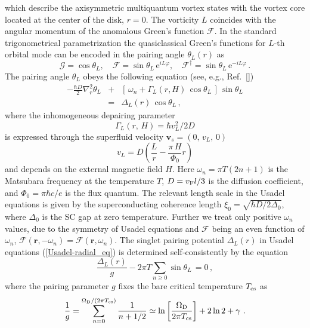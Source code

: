 \documentclass[prx,twocolumn,aps,superscriptaddress,showpacs,amsmath,amssymb,footnoteinbib]{revtex4-1}
\begin{document}
%
which describe the axisymmetric multiquantum vortex states with
the vortex core located at the center of the disk, $r=0$. The
vorticity $L$ coincides with the angular momentum of the
anomalous Green's function $\mathcal{F}$. In the standard
trigonometrical parametrization the quasiclassical Green's
functions for $L$-th orbital mode can be encoded in the pairing
angle $\theta_L(r)$ as
$$
\mathcal{G} =\cos\theta_L,\quad \mathcal{F} = \sin\theta_L\,
\mathrm{e}^{i L \varphi},\quad \mathcal{F}^\dag = \sin\theta_L\,
\mathrm{e}^{-i L \varphi}\,.
$$
The pairing angle $\theta_L$ obeys the following equation (see, e.g.,
Ref.~[])
%
\begin{eqnarray}\label{Usadel-radial_eq}
    -\frac{\hbar D}{2} \nabla_r^2 \theta_L
    &+& \left[\, \omega_n + \Gamma_L(r,H)\,\cos\theta_L\,
    \right]\,\sin\theta_L \\
    &=& \Delta_L(r)\, \cos\theta_L\,, \nonumber
\end{eqnarray}
%
where the inhomogeneous depairing parameter
%
\begin{equation}\label{depair-par}
    \Gamma_L(r,\,H) = \hbar v_L^2 / 2D
\end{equation}
%
is expressed through the superfluid velocity $\mathbf{v}_s =
(0,\,v_L,\,0)$
%
\begin{equation}\label{super_velocity}
    v_L = D \left( \frac{L}{r} - \frac{\pi\,H}{\Phi_0} r \right)
\end{equation}
%
and depends on the external magnetic field $H$.
Here $\omega_n = \pi T ( 2 n + 1 )$ is the Matsubara frequency at the temperature $T$,
$D = v_{\rm F} l / 3$ is the diffusion coefficient, and
$\Phi_0 = \pi \hbar c/e$ is the flux quantum.
The relevant length
scale in the Usadel equations is given by the superconducting
coherence length $\xi_0 = \sqrt{\hbar D / 2 \Delta_0}$, where
$\Delta_0$ is the SC gap at zero temperature.
Further we treat only positive $\omega_n$ values,
due to the symmetry of Usadel equations and $\mathcal{F}$ being an even function of
$\omega_n$, $\mathcal{F}(\mathbf{r},-\omega_n) = \mathcal{F}(\mathbf{r},\omega_n)$.
The singlet pairing potential $\Delta_L(r)$ in Usadel equations (\ref{Usadel-radial_eq}) is
determined self-consistently by the equation
%
\begin{equation}\label{self-consis_eq}
 \frac{\Delta_L(r)}{g}
 - 2\pi T \sum_{n\geq0}\sin\theta_L\, = 0\,,
\end{equation}
%
where the pairing parameter $g$ fixes the bare critical
temperature $T_{\rm cs}$ as %
\begin{multline}\label{interaction_param}
       \frac{1}{g} = \sum_{n=0}^{\Omega_{\rm D}/(2\pi T_{\rm cs})} \frac{1}{n + 1/2}
        \simeq\ln\left[\frac{\Omega_{\rm D}}{2\pi T_{\rm cs}}\right] + 2\ln2 + \gamma\ .
\end{multline}
\end{document}
